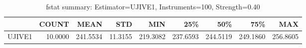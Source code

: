 \begin{table}[ht]
\centering
\caption{fstat summary: Estimator=UJIVE1, Instruments=100, Strength=0.40}
\begin{tabular}{lrrrrrrrr}
\toprule
 & COUNT & MEAN & STD & MIN & 25\% & 50\% & 75\% & MAX \\
\midrule
UJIVE1 & 10.0000 & 241.5534 & 11.3155 & 219.3082 & 237.6593 & 244.5119 & 249.1860 & 256.8605 \\
\bottomrule
\end{tabular}
\end{table}

